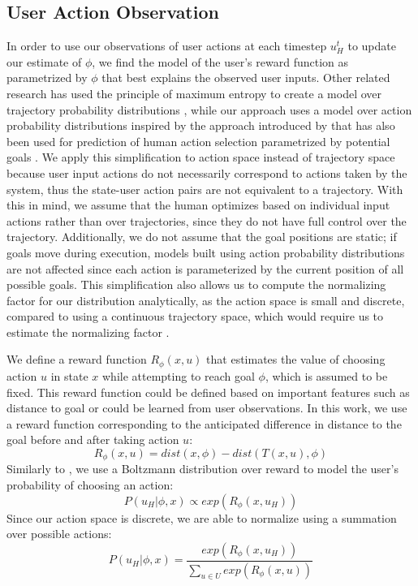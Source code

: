 \documentclass[conference]{IEEEtran}
\begin{document}
\subsection{User Action Observation}
In order to use our observations of user actions at each timestep $u_H^t$ to update our estimate of $\phi$, we find the model of the user's reward function as parametrized by $\phi$ that best explains the observed user inputs. Other related research has used the principle of maximum entropy \cite{ziebart2008maximum} to create a model over trajectory probability distributions \cite{dragan2012formalizing, javdani2015shared}, while our approach uses a model over action probability distributions inspired by the approach introduced by  \citet{ramachandran2007bayesian} that has also been used for prediction of human action selection parametrized by potential goals \cite{fisac2018probabilistically}. We apply this simplification to action space instead of trajectory space because user input actions do not necessarily correspond to actions taken by the system, thus the state-user action pairs are not equivalent to a trajectory. With this in mind, we assume that the human optimizes based on individual input actions rather than over trajectories, since they do not have full control over the trajectory. Additionally, we do not assume that the goal positions are static; if goals move during execution, models built using action probability distributions are not affected since each action is parameterized by the current position of all possible goals. This simplification also allows us to compute the normalizing factor for our distribution analytically, as the action space is small and discrete, compared to using a continuous trajectory space, which would require us to estimate the normalizing factor \cite{javdani2015shared}.

We define a reward function $R_\phi (x, u)$ that estimates the value of choosing action $u$ in state $x$ while attempting to reach goal $\phi$, which is assumed to be fixed. This reward function could be defined based on important features such as distance to goal or could be learned from user observations. In this work, we use a reward function corresponding to the anticipated difference in distance to the goal before and after taking action $u$:
\[
R_\phi (x, u) = dist(x, \phi) - dist(T(x, u), \phi)
\]
Similarly to \citet{ramachandran2007bayesian}, we use a Boltzmann distribution over reward to model the user's probability of choosing an action:
\[
P(u_H|\phi, x) \propto exp(R_\phi (x, u_H))
\]
Since our action space is discrete, we are able to normalize using a summation over possible actions:
\[
P(u_H|\phi, x) = \frac{exp(R_\phi (x, u_H))}{\sum_{u \in U} exp(R_\phi (x, u))}
\]
\end{document}
